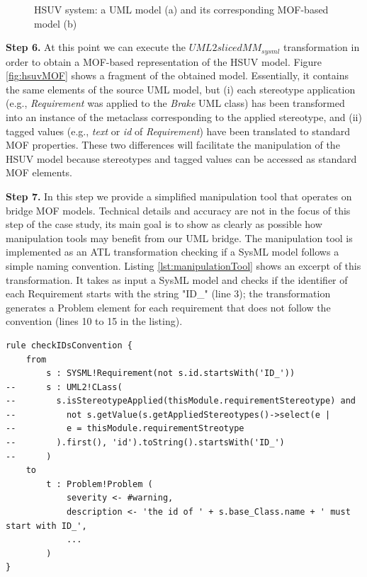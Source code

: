 \begin{figure}
  \caption{HSUV system: a UML model (a) and its corresponding MOF-based model (b)}
  \label{fig:hsuv}
\end{figure}
\vspace{-.4cm}

\textbf{Step 6.} At this point we can execute the $UML2slicedMM_{sysml}$ transformation in order to obtain a MOF-based representation
of the HSUV model. Figure \ref{fig:hsuvMOF} shows a fragment of the obtained model. 
Essentially, it contains the same elements of the source UML model, but (i) each stereotype application (e.g., \textit{Requirement}
was applied to the \textit{Brake} UML class)
has been transformed into an instance of the metaclass corresponding to the applied stereotype,
and (ii) tagged values (e.g., \textit{text} or \textit{id} of \textit{Requirement}) 
have been translated to standard MOF properties. These two differences will facilitate
the manipulation of the HSUV model because stereotypes and tagged values can be accessed as standard MOF elements.

\textbf{Step 7.} In this step we provide a simplified manipulation tool that operates on bridge MOF models. 
Technical details and accuracy are not in the focus of this step of the case study, 
its main goal is to show as clearly as possible how manipulation tools may benefit from our UML bridge. 
The manipulation tool is implemented as an ATL transformation checking if a SysML model follows a simple naming convention.
Listing \ref{lst:manipulationTool} shows an excerpt of this transformation.
It takes as input a SysML model and checks if the identifier of each Requirement starts with the string "ID\_" (line 3);
the transformation generates a Problem element for each requirement that does not follow the convention (lines 10 to 15 in the listing).
%
\begin{lstlisting}[breaklines,style=AMMA,language=ATL,mathescape,rulesepcolor=\color{black},caption=ATL transformation manipulating SysML models,captionpos=b,label={lst:manipulationTool}]
rule checkIDsConvention {
	from
		s : SYSML!Requirement(not s.id.startsWith('ID_'))
--		s : UML2!CLass(
--		  s.isStereotypeApplied(thisModule.requirementStereotype) and 
--			not s.getValue(s.getAppliedStereotypes()->select(e |
--			e = thisModule.requirementStreotype
--		  ).first(), 'id').toString().startsWith('ID_')
--		)		
	to
		t : Problem!Problem (
			severity <- #warning,
			description <- 'the id of ' + s.base_Class.name + ' must start with ID_',
			...
		)
}
\end{lstlisting}


